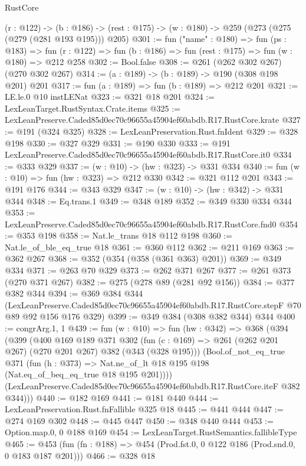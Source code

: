 \begin{lexlean}{RustCore}
\begin{coremodule}
  (r : @122) ->
  (b : @186) -> (rest : @175) -> (w : @180) -> @259 (@273 (@275 (@279 (@281 @193 @195))) @205)
@301 := fun ("name" : @180) =>
  fun (ps : @183) =>
  fun (r : @122) => fun (b : @186) => fun (rest : @175) => fun (w : @180) => @212 @258
@302 := Bool.false
@308 := @261 (@262 @302 @267) (@270 @302 @267)
@314 := (a : @189) -> (b : @189) -> @190 (@308 @198 @201) @201
@317 := fun (a : @189) => fun (b : @189) => @212 @201
@321 := LE.le.{0} @10 instLENat
@323 := @321 @18 @201
@324 := LexLeanTarget.RustSyntax.Crate.items
@325 := LexLeanPreserve.Caded85d0ec70c96655a45904ef60abdb.R17.RustCore.krate
@327 := @191 (@324 @325)
@328 := LexLeanPreservation.Rust.fnIdent
@329 := @328 @198
@330 := @327 @329
@331 := @190 @330
@333 := @191 LexLeanPreserve.Caded85d0ec70c96655a45904ef60abdb.R17.RustCore.it0
@334 := @333 @329
@337 := (w : @10) -> (hw : @323) -> @331 @334
@340 := fun (w : @10) => fun (hw : @323) => @212 @330
@342 := @321 @112 @201
@343 := @191 @176
@344 := @343 @329
@347 := (w : @10) -> (hw : @342) -> @331 @344
@348 := Eq.trans.{1}
@349 := @348 @189
@352 := @349 @330 @334 @344
@353 := LexLeanPreserve.Caded85d0ec70c96655a45904ef60abdb.R17.RustCore.fnd0
@354 := @353 @198
@358 := Nat.le_trans @18 @112 @198
@360 := Nat.le_of_ble_eq_true @18
@361 := @360 @112
@362 := @211 @169
@363 := @362 @267
@368 := @352 (@354 (@358 (@361 @363) @201))
@369 := @349 @334
@371 := @263 @70 @329
@373 := @262 @371 @267
@377 := @261 @373 (@270 @371 @267)
@382 := @275 (@278 @89 (@281 @92 @156))
@384 := @377 @382 @344
@394 := @369
    @384
    @344
    (LexLeanPreserve.Caded85d0ec70c96655a45904ef60abdb.R17.RustCore.stepF
      @70
      @89
      @92
      @156
      @176
      @329)
@399 := @349 @384 (@308 @382 @344) @344
@400 := congrArg.{1, 1}
@439 := fun (w : @10) =>
  fun (hw : @342) =>
  @368
    (@394
      (@399
        (@400
          @169
          @189
          @371
          @302
          (fun (c : @169) => @261 (@262 @201 @267) (@270 @201 @267) @382 (@343 (@328 @195)))
          (Bool.of_not_eq_true
            @371
            (fun (h : @373) => Nat.ne_of_lt @18 @195 @198 (Nat.eq_of_beq_eq_true @18 @195 @201))))
        (LexLeanPreserve.Caded85d0ec70c96655a45904ef60abdb.R17.RustCore.iteF @382 @344)))
@440 := @182 @169
@441 := @181 @440
@444 := LexLeanPreservation.Rust.fnFallible @325 @18
@445 := @441 @444
@447 := @274 @169 @302
@448 := @445 @447
@450 := @348 @440 @444
@453 := Option.map.{0, 0} @188 @169
@454 := LexLeanTarget.RustSemantics.fallibleType
@465 := @453 (fun (fn : @188) => @454 (Prod.fst.{0, 0} @122 @186 (Prod.snd.{0, 0} @183 @187 @201)))
@466 := @328 @18

\end{coremodule}
\end{lexlean}
